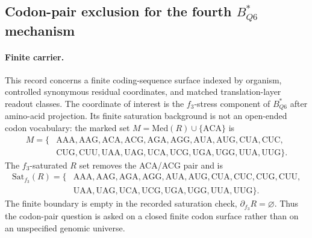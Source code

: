 \subsection{Codon-pair exclusion for the fourth $B^{*}_{Q6}$ mechanism}\label{subsec:bioreality-q6-codon-pair-not-identity}

\paragraph{Finite carrier.}
This record concerns a finite coding-sequence surface indexed by organism, controlled synonymous residual coordinates, and matched translation-layer readout classes. The coordinate of interest is the $f_{3}$-stress component of $B^{*}_{Q6}$ after amino-acid projection. Its finite saturation background is not an open-ended codon vocabulary: the marked set $M = \mathrm{Med}(R) \cup \{\mathrm{ACA}\}$ is
$$
\begin{aligned}
M = \{&\mathrm{AAA},\mathrm{AAG},\mathrm{ACA},\mathrm{ACG},\mathrm{AGA},\mathrm{AGG},\mathrm{AUA},\mathrm{AUG},\mathrm{CUA},\mathrm{CUC},\\
&\mathrm{CUG},\mathrm{CUU},\mathrm{UAA},\mathrm{UAG},\mathrm{UCA},\mathrm{UCG},\mathrm{UGA},\mathrm{UGG},\mathrm{UUA},\mathrm{UUG}\}.
\end{aligned}
$$
The $f_{3}$-saturated $R$ set removes the ACA/ACG pair and is
$$
\begin{aligned}
\mathrm{Sat}_{f_{3}}(R)=\{&\mathrm{AAA},\mathrm{AAG},\mathrm{AGA},\mathrm{AGG},\mathrm{AUA},\mathrm{AUG},\mathrm{CUA},\mathrm{CUC},\mathrm{CUG},\mathrm{CUU},\\
&\mathrm{UAA},\mathrm{UAG},\mathrm{UCA},\mathrm{UCG},\mathrm{UGA},\mathrm{UGG},\mathrm{UUA},\mathrm{UUG}\}.
\end{aligned}
$$
The finite boundary is empty in the recorded saturation check, $\partial_{f_{3}}R=\varnothing$. Thus the codon-pair question is asked on a closed finite codon surface rather than on an unspecified genomic universe.

